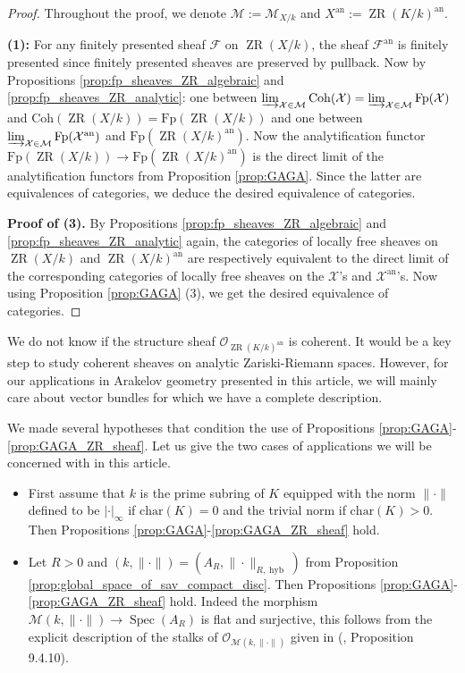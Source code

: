\documentclass [11pt,reqno]{amsart}
\newcommand{\1}{\mathmybb{1}}
\def\cF{{\mathcal{F}}}
\def\cM{{\mathcal{M}}}
\def\cO{{\mathcal{O}}}
\def\cX{{\mathcal{X}}}
\def\an{\operatorname{an}}
\def\hyb{\operatorname{hyb}}
\def\Spec{\operatorname{Spec}}
\def\ZR{\operatorname{ZR}}
\begin{document}
\begin{proof}
Throughout the proof, we denote $\cM:=\cM_{X/k}$ and $X^{\an}:=\ZR(K/k)^{\an}$. 

\textbf{(1):} For any finitely presented sheaf $\cF$ on $\ZR(X/k)$, the sheaf $\cF^{\an}$ is finitely presented since finitely presented sheaves are preserved by pullback. Now by Propositions \ref{prop:fp_sheaves_ZR_algebraic} and \ref{prop:fp_sheaves_ZR_analytic}: one between $\varinjlim_{\cX\in\cM}\mathrm{Coh}(\cX)=\varinjlim_{\cX\in\cM}\mathrm{Fp}(\cX)$ and $\mathrm{Coh}(\ZR(X/k))=\mathrm{Fp}(\ZR(X/k))$ and one between $\varinjlim_{\cX\in\cM}\mathrm{Fp}(\cX^{\an})$ and $\mathrm{Fp}(\ZR(X/k)^{\an})$. Now the analytification functor $\mathrm{Fp}(\ZR(X/k))\to \mathrm{Fp}(\ZR(X/k)^{\an})$ is the direct limit of the analytification functors from Proposition \ref{prop:GAGA}. Since the latter are equivalences of categories, we deduce the desired equivalence of categories.

\textbf{Proof of (3).} By Propositions \ref{prop:fp_sheaves_ZR_algebraic} and \ref{prop:fp_sheaves_ZR_analytic} again, the categories of locally free sheaves on $\ZR(X/k)$ and $\ZR(X/k)^{\an}$ are respectively equivalent to the direct limit of the corresponding categories of locally free sheaves on the $\cX$'s and $\cX^{\an}$'s. Now using Proposition \ref{prop:GAGA} (3), we get the desired equivalence of categories.
\end{proof}

\begin{remark}
\label{rem:coherence_strcture_sheaf_ZR_analytic}
We do not know if the structure sheaf $\cO_{\ZR(K/k)^{\an}}$ is coherent. It would be a key step to study coherent sheaves on analytic Zariski-Riemann spaces. However, for our applications in Arakelov geometry presented in this article, we will mainly care about vector bundles for which we have a complete description.
\end{remark}

\begin{example}
\label{example:GAGA}
We made several hypotheses that condition the use of Propositions \ref{prop:GAGA}-\ref{prop:GAGA_ZR_sheaf}. Let us give the two cases of applications we will be concerned with in this article. 
\begin{itemize}
	\item[(1)] First assume that $k$ is the prime subring of $K$ equipped with the norm $\|\cdot\|$ defined to be $|\cdot|_{\infty}$ if $\mathrm{char}(K)=0$ and the trivial norm if $\mathrm{char}(K)>0$. Then Propositions \ref{prop:GAGA}-\ref{prop:GAGA_ZR_sheaf} hold. 
	\item[(2)] Let $R>0$ and $(k,\|\cdot\|)=(A_{R},\|\cdot\|_{R,\hyb})$ from Proposition \ref{prop:global_space_of_sav_compact_disc}. Then Propositions \ref{prop:GAGA}-\ref{prop:GAGA_ZR_sheaf} hold. Indeed the morphism $\cM(k,\|\cdot\|)\to\Spec(A_{R})$ is flat and surjective, this follows from the explicit description of the stalks of $\cO_{\cM(k,\|\cdot\|)}$ given in (\cite{Sedillot_pav}, Proposition 9.4.10).
\end{itemize}
\end{example}
\end{document}
